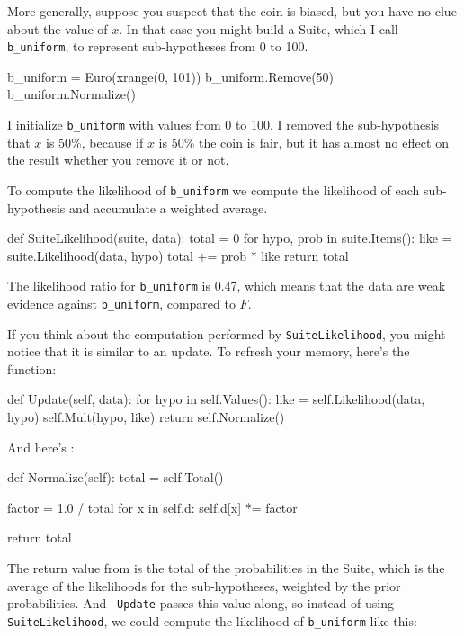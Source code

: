 \documentclass[12pt]{book}
\theoremstyle{exercise}
\begin{document}
More generally, suppose you suspect that the coin is biased, but you
have no clue about the value of $x$.  In that case you might build a
Suite, which I call \verb"b_uniform", to represent sub-hypotheses from
0 to 100.

\begin{code}
    b_uniform = Euro(xrange(0, 101))
    b_uniform.Remove(50)
    b_uniform.Normalize()
\end{code}

I initialize \verb"b_uniform" with values from 0 to 100.
I removed the sub-hypothesis that $x$ is 50\%, because if
$x$ is 50\% the coin is fair, but it has almost no
effect on the result whether you remove it or not.

To compute the likelihood of
\verb"b_uniform" we compute the likelihood of each sub-hypothesis
and accumulate a weighted average.

\begin{code}
def SuiteLikelihood(suite, data):
    total = 0
    for hypo, prob in suite.Items():
        like = suite.Likelihood(data, hypo)
        total += prob * like
    return total
\end{code}

The likelihood ratio for \verb"b_uniform" is 0.47, which means
that the data are weak evidence against \verb"b_uniform",
compared to $F$.

If you think about the computation performed by
\verb"SuiteLikelihood", you might notice that it is similar to an
update.  To refresh your memory, here's the  function:

\begin{code}
    def Update(self, data):
        for hypo in self.Values():
            like = self.Likelihood(data, hypo)
            self.Mult(hypo, like)
        return self.Normalize()
\end{code}

And here's :

\begin{code}
    def Normalize(self):
        total = self.Total()
        
        factor = 1.0 / total
        for x in self.d:
            self.d[x] *= factor

        return total
\end{code}

The return value from  is the total of the
probabilities in the Suite, which is the average of the likelihoods
for the sub-hypotheses, weighted by the prior probabilities.  And {\tt
  Update} passes this value along, so instead of using {\tt
  SuiteLikelihood}, we could compute the likelihood of
\verb"b_uniform" like this:
\end{document}
